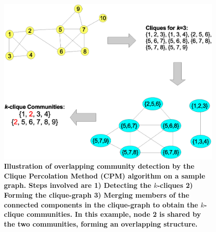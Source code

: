 \begin{figure}%
  \centering
    \includegraphics[scale=0.4]{cpm.eps}
    
  \caption{{\bf Illustration of overlapping community detection by the Clique Percolation Method (CPM) algorithm on a sample graph. Steps involved are 1) Detecting the $k$-cliques 2) Forming the clique-graph 3) Merging members of the connected components in the clique-graph to obtain the $k$-clique communities. In this example, node 2 is shared by the two communities, forming an overlapping structure.}}
\label{fig-cpm}
\end{figure}



